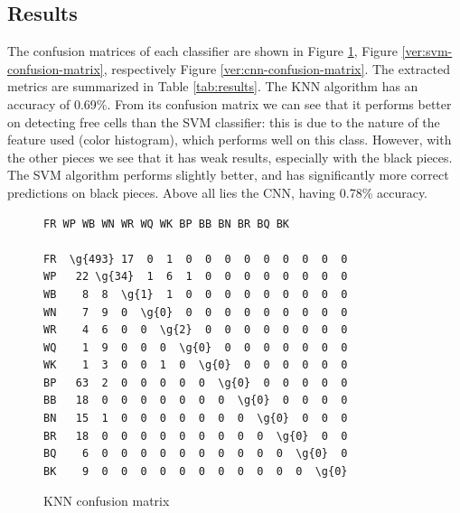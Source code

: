 
\subsection{Results} \label{subsec:ip-results}

The confusion matrices of each classifier are shown in Figure \ref{ver:knn-confusion-matrix}, Figure \ref{ver:svm-confusion-matrix}, respectively Figure \ref{ver:cnn-confusion-matrix}. The extracted metrics are summarized in Table \ref{tab:results}. The KNN algorithm has an accuracy of 0.69\%. From its confusion matrix we can see that it performs better on detecting free cells than the SVM classifier: this is due to the nature of the feature used (color histogram), which performs well on this class. However, with the other pieces we see that it has weak results, especially with the black pieces. The SVM algorithm performs slightly better, and has significantly more correct predictions on black pieces. Above all lies the CNN, having 0.78\% accuracy.

\begin{figure}[h]
    \centering
    \begin{BVerbatim}[fontsize=\scriptsize,commandchars=\\\{\}]
     FR WP WB WN WR WQ WK BP BB BN BR BQ BK

FR  \g{493} 17  0  1  0  0  0  0  0  0  0  0  0
WP   22 \g{34}  1  6  1  0  0  0  0  0  0  0  0
WB    8  8  \g{1}  1  0  0  0  0  0  0  0  0  0
WN    7  9  0  \g{0}  0  0  0  0  0  0  0  0  0
WR    4  6  0  0  \g{2}  0  0  0  0  0  0  0  0
WQ    1  9  0  0  0  \g{0}  0  0  0  0  0  0  0
WK    1  3  0  0  1  0  \g{0}  0  0  0  0  0  0
BP   63  2  0  0  0  0  0  \g{0}  0  0  0  0  0
BB   18  0  0  0  0  0  0  0  \g{0}  0  0  0  0
BN   15  1  0  0  0  0  0  0  0  \g{0}  0  0  0
BR   18  0  0  0  0  0  0  0  0  0  \g{0}  0  0
BQ    6  0  0  0  0  0  0  0  0  0  0  \g{0}  0
BK    9  0  0  0  0  0  0  0  0  0  0  0  \g{0}
    \end{BVerbatim}
    \caption{KNN confusion matrix}
    \label{ver:knn-confusion-matrix}
\end{figure}

